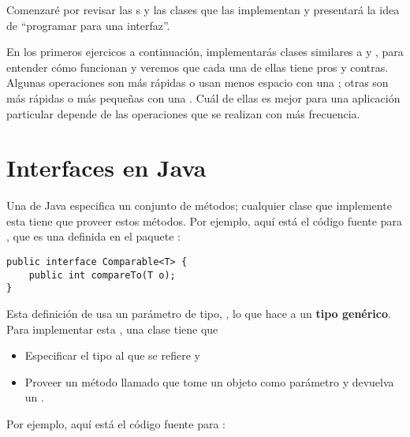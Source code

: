 \documentclass[12pt]{book}
\theoremstyle{exercise}
\begin{document}

Comenzaré por revisar las s y las clases que las
implementan y presentará la idea de ``programar para una interfaz''.


En los primeros ejercicos a continuación, implementarás clases similares 
a  y , para entender cómo funcionan
y veremos que cada una de ellas tiene pros y contras. Algunas operaciones
son más rápidas o usan menos espacio con una ; otras
son más rápidas o más pequeñas con una .  Cuál de ellas
es mejor para una aplicación particular depende de las operaciones que
se realizan con más frecuencia.


\section{Interfaces en Java}
\label{interfaces-in-java}

Una  de Java especifica un conjunto de métodos; cualquier clase
que implemente esta  tiene que proveer estos métodos. Por
ejemplo, aquí está el código fuente para , que es una
 definida en el paquete :


\begin{verbatim}
public interface Comparable<T> {
    public int compareTo(T o);
}
\end{verbatim}


Esta definición de  usa un parámetro de tipo, , lo que
hace a  un {\bf tipo genérico}.  
Para implementar esta , una clase tiene que

\begin{itemize}

\item Especificar el tipo al que  se refiere y

\item Proveer un método llamado  que tome un objeto como
parámetro y devuelva un .

\end{itemize}


Por ejemplo, aquí está el código fuente para :
\end{document}
